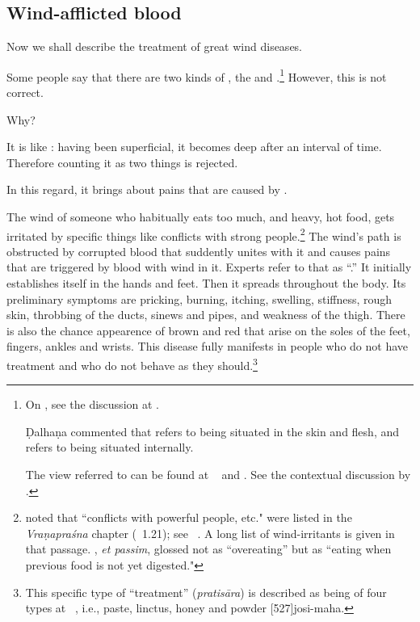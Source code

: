 \begin{translation}

\subsection{Wind-afflicted blood}
\item [1]
Now we shall describe the treatment of great wind diseases.



\item [3]

Some people say that there are two kinds of
, the
 and .\footnote{On
, see the discussion at
\pageref{ni1:vatarakta}.

Ḍalhaṇa commented \citep[424]{vulgate} that  refers to
being situated in the skin and flesh, and  refers to
being situated internally.

The view referred to can be found at \CS\  and
.  See the contextual discussion by
\citet[101]{emme-1984}.} However, this is not correct.

Why?

It is like : having been superficial,
it becomes deep after an interval of time.  Therefore counting it as
two things is rejected.

\item[4]

In this regard, it brings about pains that are caused by
.

The wind of someone who habitually eats too much, and heavy, hot food,
gets irritated by specific things like conflicts with  strong
people.\footnote{ noted that “conflicts with
    powerful people, etc." were listed in the \emph{Vraṇapraśna} chapter
    (\SS\ 1.21); see \SS\ . A long list of wind-irritants
    is given in that passage.  , \emph{et passim},
    glossed  not as “overeating” but as “eating when
    previous food is not yet digested."} The wind's path is obstructed by
    corrupted blood that suddently unites with it and causes pains that
    are triggered by blood with wind in it.  Experts refer to that as
    “.”  It initially establishes
    itself in the hands and feet.  Then it spreads throughout the body.
    Its preliminary symptoms are pricking, burning, itching, swelling,
    stiffness, rough skin, throbbing of the ducts, sinews and pipes, and
    weakness of the thigh. There is also the chance appearence of brown
    and red  that arise on the soles of the
    feet, fingers, ankles and wrists. This disease fully manifests in
    people who do not have treatment and who do not behave as they
    should.\footnote{This specific type of “treatment” (\emph{pratisāra})
        is described as being of four types at \SS\ , i.e.,
        paste, linctus, honey and powder [527]{josi-maha}.}


\end{translation}
